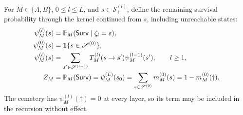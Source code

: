 \begin{theoremenv}\label{ptnb:thm:conditioned-survival}
For $M\in\{A,B\}$, $0\le l\le L$, and $s\in\mathcal S_+^{(l)}$, define the remaining survival probability through the kernel continued from $s$, including unreachable states:
\begin{align}
 \psi_M^{(l)}(s)&=\mathbb P_M(\mathsf{Surv}\mid\zeta_l=s),
 \label{ptnb:eq:survival-function}\\
 \psi_M^{(0)}(s)&=\mathbf{1}\{s\in\mathscr S^{(0)}\},
 \label{ptnb:eq:survival-boundary}\\
 \psi_M^{(l)}(s)&=\sum_{s'\in\mathscr S^{(l-1)}}T_M^{(l)}(s\to s')\psi_M^{(l-1)}(s'),\qquad l\ge1,
 \label{ptnb:eq:survival-recursion}\\
 Z_M&=\mathbb P_M(\mathsf{Surv})=\psi_M^{(L)}(s_0)
 =\sum_{s\in\mathscr S^{(0)}}m_M^{(0)}(s)=1-m_M^{(0)}(\dagger).
 \label{ptnb:eq:survival-mass}
\end{align}
The cemetery has $\psi_M^{(l)}(\dagger)=0$ at every layer, so its term may be included in the recursion without effect.


\end{theoremenv}
